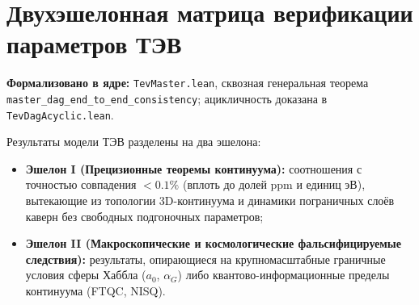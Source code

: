 \documentclass[11pt,a4paper]{article}
\theoremstyle{definition}
\theoremstyle{remark}
\begin{document}
\section{Двухэшелонная матрица верификации параметров ТЭВ}
\noindent\small\textbf{Формализовано в ядре:} \texttt{TevMaster.lean}, сквозная генеральная теорема \texttt{master\_dag\_end\_to\_end\_consistency}; ацикличность доказана в \texttt{TevDagAcyclic.lean}.

Результаты модели ТЭВ разделены на два эшелона:
\begin{itemize}
\item \textbf{Эшелон I (Прецизионные теоремы континуума):} соотношения с точностью совпадения $< 0.1\%$ (вплоть до долей ppm и единиц эВ), вытекающие из топологии 3D-континуума и динамики пограничных слоёв каверн без свободных подгоночных параметров;
\item \textbf{Эшелон II (Макроскопические и космологические фальсифицируемые следствия):} результаты, опирающиеся на крупномасштабные граничные условия сферы Хаббла ($a_0$, $\alpha_G$) либо квантово-информационные пределы континуума (FTQC, NISQ).
\end{itemize}

\begingroup
\small
\setlength{\tabcolsep}{3.5pt}
\renewcommand{\arraystretch}{1.25}
\end{document}
